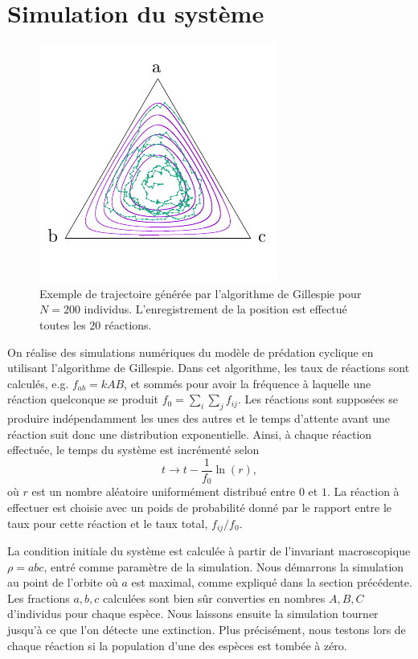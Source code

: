 \documentclass[openany,a4paper,12pt]{article}
\begin{document}
\section{Simulation du système}
\label{section_simulation}

\begin{figure}[t]
	\centering
	\includegraphics[width=0.7\linewidth]{figures/portrait_trajectory}
	\caption{Exemple de trajectoire générée par l'algorithme de Gillespie pour $N=200$ individus. L'enregistrement de la position est effectué toutes les $20$ réactions.}
	\label{fig:portrait_trajectoire}
\end{figure}

\par On réalise des simulations numériques du modèle de prédation cyclique en utilisant l'algorithme de Gillespie. Dans cet algorithme, les taux de réactions sont calculés, e.g. $f_{ab} = k AB$, et sommés pour avoir la fréquence à laquelle une réaction quelconque se produit $f_0 = \sum_i\sum_j f_{ij}$. Les réactions sont supposées se produire indépendamment les unes des autres et le temps d'attente avant une réaction suit donc une distribution exponentielle. Ainsi, à chaque réaction effectuée, le temps du système est incrémenté selon
%
\begin{equation}\label{gillespie_incr_temps}
	t \rightarrow t - \frac{1}{f_0} \ln(r),
\end{equation}
%
où $r$ est un nombre aléatoire uniformément distribué entre $0$ et $1$.
La réaction à effectuer est choisie avec un poids de probabilité donné par le rapport entre le taux pour cette réaction et le taux total, $f_{ij}/f_0$.

\par La condition initiale du système est calculée à partir de l'invariant macroscopique $\rho=abc$, entré comme paramètre de la simulation. Nous démarrons la simulation au point de l'orbite où $a$ est maximal, comme expliqué dans la section précédente. Les fractions $a,b,c$ calculées sont bien sûr converties en nombres $A,B,C$ d'individus pour chaque espèce. Nous laissons ensuite la simulation tourner jusqu'à ce que l'on détecte une extinction. Plus précisément, nous testons lors de chaque réaction si la population d'une des espèces est tombée à zéro.
\end{document}

